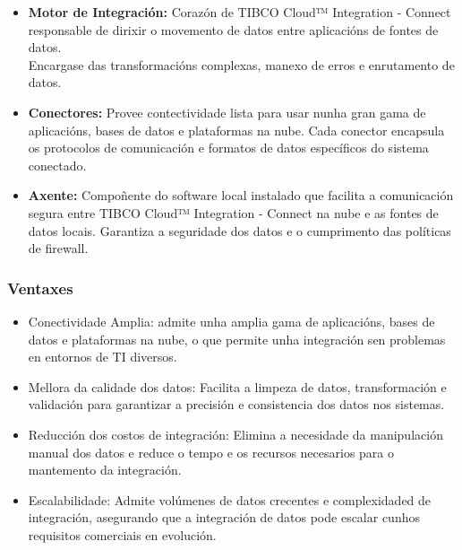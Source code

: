 \begin{itemize}
    \item \textbf{Motor de Integración:} Corazón de TIBCO Cloud™ Integration - Connect responsable de dirixir o movemento de datos entre aplicacións de fontes de datos.\\
    Encargase das transformacións complexas, manexo de erros e enrutamento de datos.
    \item \textbf{Conectores:} Provee contectividade lista para usar nunha gran gama de aplicacións, bases de datos e plataformas na nube. Cada conector encapsula os protocolos de comunicación e formatos de datos específicos do sistema conectado.
    \item \textbf{Axente: }Compoñente do software local instalado que facilita a comunicación segura entre TIBCO Cloud™ Integration - Connect na nube e as fontes de datos locais. Garantiza a seguridade dos datos e o cumprimento das políticas de firewall.
\end{itemize}

\subsubsection{Ventaxes }

\begin{itemize}
    \item Conectividade Amplia: admite unha amplia gama de aplicacións, bases de datos e plataformas na nube, o que permite unha integración sen problemas en entornos de TI diversos.
    \item Mellora da calidade dos datos: Facilita a limpeza de datos, transformación e validación para garantizar a precisión e consistencia dos datos nos sistemas.
    \item Reducción dos costos de integración: Elimina a necesidade da manipulación manual dos datos e reduce o tempo e os recursos necesarios para o mantemento da integración.
    \item Escalabilidade: Admite volúmenes de datos crecentes e complexidaded de integración, asegurando que a integración de datos pode escalar cunhos requisitos comerciais en evolución.
\end{itemize}

